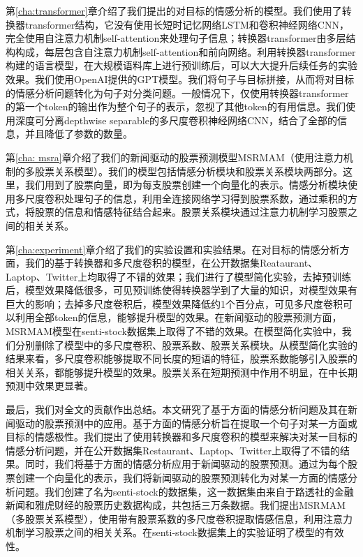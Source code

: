 第\ref{cha:transformer}章介绍了我们提出的对目标的情感分析的模型。我们使用了转换器transformer结构，它没有使用长短时记忆网络LSTM和卷积神经网络CNN，完全使用自注意力机制self-attention来处理句子信息；转换器transformer由多层结构构成，每层包含自注意力机制self-attention和前向网络。利用转换器transformer构建的语言模型，在大规模语料库上进行预训练后，可以大大提升后续任务的实验效果。我们使用OpenAI提供的GPT模型。我们将句子与目标拼接，从而将对目标的情感分析问题转化为句子对分类问题。一般情况下，仅使用转换器transformer的第一个token的输出作为整个句子的表示，忽视了其他token的有用信息。我们使用深度可分离depthwise separable的多尺度卷积神经网络CNN，结合了全部的信息，并且降低了参数的数量。

第\ref{cha: msra}章介绍了我们的新闻驱动的股票预测模型MSRMAM（使用注意力机制的多股票关系模型）。我们的模型包括情感分析模块和股票关系模块两部分。这里，我们用到了股票向量，即为每支股票创建一个向量化的表示。情感分析模块使用多尺度卷积处理句子的信息，利用全连接网络学习得到股票系数，通过乘积的方式，将股票的信息和情感特征结合起来。股票关系模块通过注意力机制学习股票之间的相关关系。

第\ref{cha:experiment}章介绍了我们的实验设置和实验结果。在对目标的情感分析方面，我们的基于转换器和多尺度卷积的模型，在公开数据集Reataurant、Laptop、Twitter上均取得了不错的效果；我们进行了模型简化实验，去掉预训练后，模型效果降低很多，可见预训练使得转换器学到了大量的知识，对模型效果有巨大的影响；去掉多尺度卷积后，模型效果降低约1个百分点，可见多尺度卷积可以利用全部token的信息，能够提升模型的效果。在新闻驱动的股票预测方面，MSRMAM模型在senti-stock数据集上取得了不错的效果。在模型简化实验中，我们分别删除了模型中的多尺度卷积、股票系数、股票关系模块。从模型简化实验的结果来看，多尺度卷积能够提取不同长度的短语的特征，股票系数能够引入股票的相关关系，都能够提升模型的效果。股票关系在短期预测中作用不明显，在中长期预测中效果更显著。

最后，我们对全文的贡献作出总结。本文研究了基于方面的情感分析问题及其在新闻驱动的股票预测中的应用。基于方面的情感分析旨在提取一个句子对某一方面或目标的情感极性。我们提出了使用转换器和多尺度卷积的模型来解决对某一目标的情感分析问题，并在公开数据集Restaurant、Laptop、Twitter上取得了不错的结果。同时，我们将基于方面的情感分析应用于新闻驱动的股票预测。通过为每个股票创建一个向量化的表示，我们将新闻驱动的股票预测转化为对某一方面的情感分析问题。我们创建了名为senti-stock的数据集，这一数据集由来自于路透社的金融新闻和雅虎财经的股票历史数据构成，共包括三万条数据。我们提出MSRMAM（多股票关系模型），使用带有股票系数的多尺度卷积提取情感信息，利用注意力机制学习股票之间的相关关系。在senti-stock数据集上的实验证明了模型的有效性。

